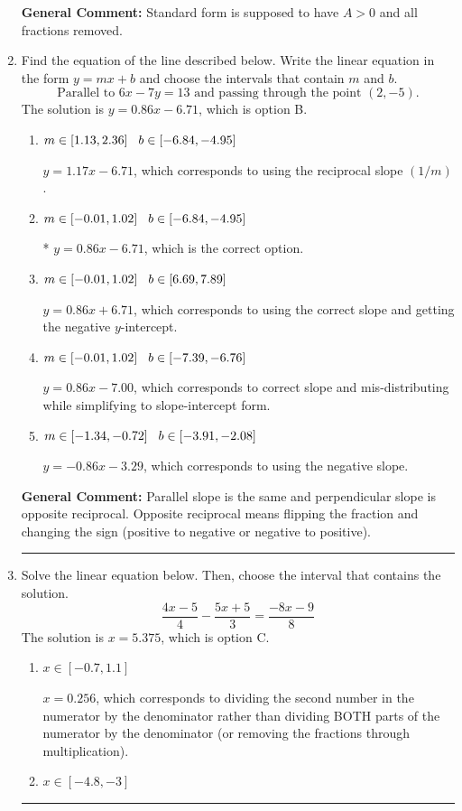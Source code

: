 \documentclass{extbook}[14pt]
\newcommand{\litem}[1]{\item #1

\rule{\textwidth}{0.4pt}}
\begin{document}
\begin{enumerate}
{\textbf{General Comment:} Standard form is supposed to have $A > 0$ and all fractions removed.
}
\litem{
Find the equation of the line described below. Write the linear equation in the form $ y=mx+b $ and choose the intervals that contain $m$ and $b$.
\[ \text{Parallel to } 6 x - 7 y = 13 \text{ and passing through the point } (2, -5). \]The solution is \( y = 0.86x - 6.71 \), which is option B.\begin{enumerate}[label=\Alph*.]
\item \( m \in [1.13, 2.36] \hspace*{3mm} b \in [-6.84, -4.95] \)

 $y = 1.17x - 6.71$, which corresponds to using the reciprocal slope $(1/m)$.
\item \( m \in [-0.01, 1.02] \hspace*{3mm} b \in [-6.84, -4.95] \)

* $y = 0.86x - 6.71$, which is the correct option.
\item \( m \in [-0.01, 1.02] \hspace*{3mm} b \in [6.69, 7.89] \)

 $y = 0.86x + 6.71$, which corresponds to using the correct slope and getting the negative $y$-intercept.
\item \( m \in [-0.01, 1.02] \hspace*{3mm} b \in [-7.39, -6.76] \)

 $y = 0.86x - 7.00$, which corresponds to correct slope and mis-distributing while simplifying to slope-intercept form.
\item \( m \in [-1.34, -0.72] \hspace*{3mm} b \in [-3.91, -2.08] \)

 $y = -0.86x - 3.29$, which corresponds to using the negative slope.
\end{enumerate}

\textbf{General Comment:} Parallel slope is the same and perpendicular slope is opposite reciprocal. Opposite reciprocal means flipping the fraction and changing the sign (positive to negative or negative to positive).
}
\litem{
Solve the linear equation below. Then, choose the interval that contains the solution.
\[ \frac{4x -5}{4} - \frac{5x + 5}{3} = \frac{-8x -9}{8} \]The solution is \( x = 5.375 \), which is option C.\begin{enumerate}[label=\Alph*.]
\item \( x \in [-0.7, 1.1] \)

 $x = 0.256$, which corresponds to dividing the second number in the numerator by the denominator rather than dividing BOTH parts of the numerator by the denominator (or removing the fractions through multiplication).
\item \( x \in [-4.8, -3] \)


\end{enumerate}}
\end{enumerate}
\end{document}
